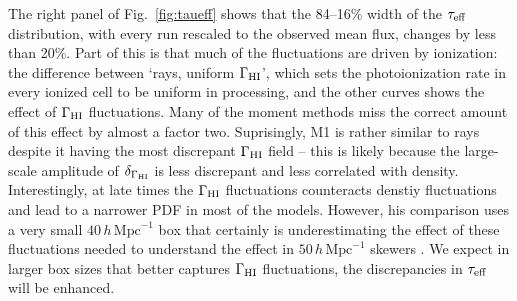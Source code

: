 \documentclass[iop]{openjournal}
\newcommand{\hmpc}{\,h\,\mathrm{Mpc}^{-1}}
\begin{document}
The right panel of Fig.~\ref{fig:taueff} shows that the 84--16\% width of the $\tau_{\rm eff}$ distribution, with every run rescaled to the observed mean flux, changes by less than 20\%.  Part of this is that much of the fluctuations are driven by ionization: the difference between `rays, uniform $\Gamma_{\rm HI}$', which sets the photoionization rate in every ionized cell to be uniform in processing, and the other curves shows the effect of $\Gamma_{\rm HI}$ fluctuations.  Many of the moment methods miss the correct amount of this effect by almost a factor two. Suprisingly, M1 is rather similar to rays despite it having the most discrepant $\Gamma_{\rm HI}$ field -- this is likely because the large-scale amplitude of $\delta_{\Gamma_{\rm HI}}$ is less discrepant and less correlated with density.  Interestingly, at late times the   $\Gamma_{\rm HI}$ fluctuations counteracts denstiy fluctuations and lead to a narrower PDF in most of the models.  However, his comparison uses a very small $40\hmpc$ box that certainly is underestimating the effect of these fluctuations needed to understand the effect in $50\hmpc$ skewers \citep{davies16,davies17}. We expect in larger box sizes that better captures  $\Gamma_{\rm HI}$ fluctuations, the discrepancies in $\tau_{\rm eff}$ will be enhanced.

\end{document}
